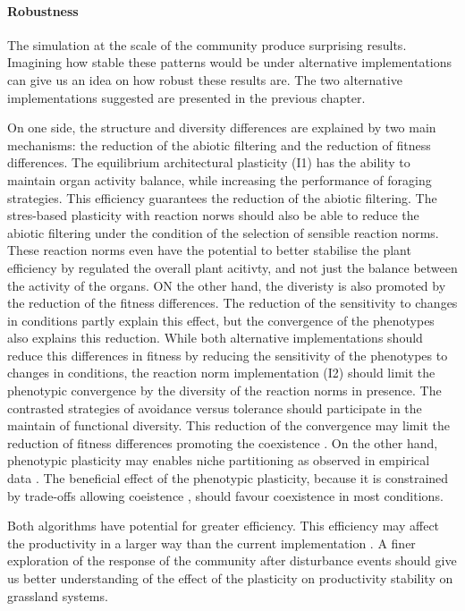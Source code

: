 \paragraph{Robustness}

The simulation at the scale of the community produce surprising results. Imagining how stable these patterns would be under alternative implementations can give us an idea on how robust these results are. The two alternative implementations suggested are presented in the previous chapter. 

On one side, the structure and diversity differences are explained by two main mechanisms: the reduction of the abiotic filtering and the reduction of fitness differences. The equilibrium architectural plasticity (I1) has the ability to maintain organ activity balance, while increasing the performance of foraging strategies. This efficiency \parencite{maire_plasticity_2013} guarantees the reduction of the abiotic filtering. The stres-based plasticity with reaction norws should also be able to reduce the abiotic filtering under the condition of the selection of sensible reaction norms. These reaction norms even have the potential to better stabilise the plant efficiency by regulated the overall plant acitivty, and not just the balance between the activity of the organs. ON the other hand, the diveristy is also promoted by the reduction of the fitness differences. The reduction of the sensitivity to changes in conditions partly explain this effect, but the convergence of the phenotypes also explains this reduction. While both alternative implementations should reduce this differences in fitness by reducing the sensitivity of the phenotypes to changes in conditions, the reaction norm implementation (I2) should limit the phenotypic convergence by the diversity of the reaction norms in presence. The contrasted strategies of avoidance versus tolerance should participate in the maintain of functional diversity. This reduction of the convergence may limit the reduction of fitness differences promoting the coexistence \parencite{chesson_general_2000}. On the other hand, phenotypic plasticity may enables niche partitioning as observed in empirical data \parencite{zuppinger-dingley_selection_2014, roscher_contrasting_2015}. The beneficial effect of the phenotypic plasticity, because it is constrained by trade-offs allowing coeistence \parencite{tilman_niche_2004}, should favour coexistence in most conditions.


Both algorithms have potential for greater efficiency. This efficiency may affect the productivity in a larger way than the current implementation \parencite{maire_plasticity_2013}. A finer exploration of the response of the community after disturbance events should give us better understanding of the effect of the plasticity on productivity stability \parencite{richter_phenotypic_2012} on grassland systems.

